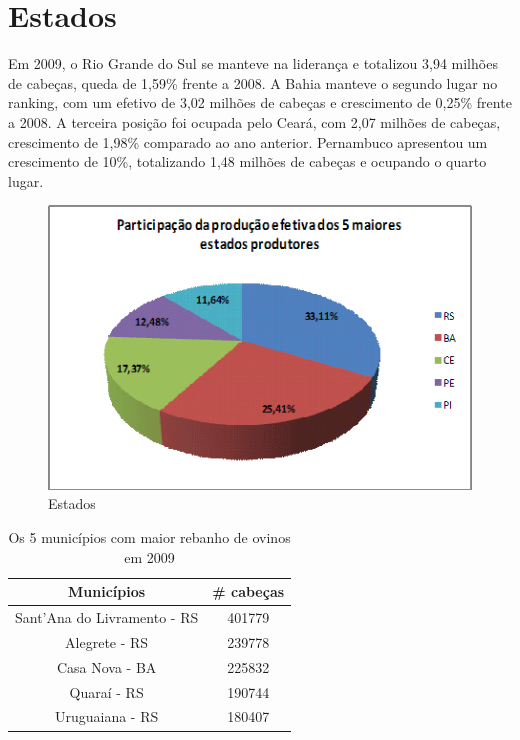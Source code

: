 \documentclass[12pt, a4paper, twocolumn]{article}
\begin{document}
\section{Estados}
Em 2009, o Rio Grande do Sul se manteve na liderança e totalizou 3,94 milhões de cabeças, queda de 1,59\% frente a 2008. A Bahia manteve o segundo lugar no ranking, com um efetivo de 3,02 milhões de cabeças e crescimento de 0,25\% frente a 2008. A terceira posição foi ocupada pelo Ceará, com 2,07 milhões de cabeças, crescimento de 1,98\% comparado ao ano anterior. Pernambuco apresentou um crescimento de 10\%, totalizando 1,48 milhões de cabeças e ocupando o quarto lugar. 
\begin{figure}[htb]
\centering
\includegraphics[width=.3\textwidth]{estados.png}
\caption{Estados}
\label{fig:estados}
\end{figure}

\begin{table}[htb]
\centering
\caption{Os 5 municípios com maior rebanho de ovinos em 2009}
\label{tab:mun}
\begin{tabular}{|c|c|}
\hline 
\textbf{Municípios} & \textbf{\# cabeças} \\ \hline
Sant'Ana do Livramento - RS & 401779 \\ \hline
Alegrete - RS & 239778 \\ \hline
Casa Nova - BA & 225832 \\ \hline
Quaraí - RS & 190744 \\ \hline
Uruguaiana - RS & 180407 \\ \hline
\end{tabular}
\end{table}



\end{document}
